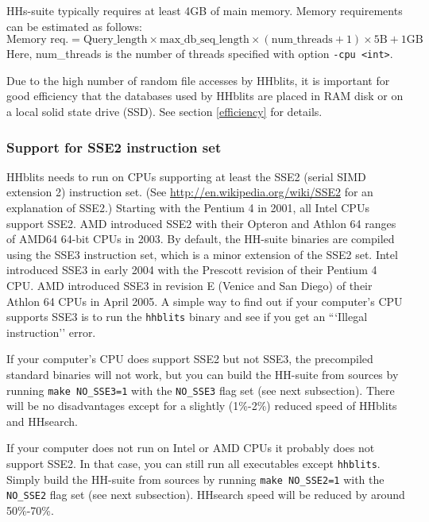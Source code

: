 \documentclass[11pt,a4paper]{article}
\begin{document}
HHs-suite typically requires at least 4GB of main memory. Memory requirements can be estimated as follows:
\begin{equation}
\textrm{Memory req.} = \textrm{Query\_length} \times \textrm{max\_db\_seq\_length} \times (\textrm{num\_threads}+1) \times 5 \textrm{B} + 1 \textrm{GB} 
\end{equation}
Here, num\_threads is the number of threads specified with option \verb`-cpu <int>`.

Due to the high number of random file accesses by HHblits, it is important for good efficiency that the databases used by HHblits are placed in RAM disk or on a local solid state drive (SSD). See section \ref{efficiency} for details.


\subsubsection*{Support for SSE2 instruction set} 

HHblits needs to run on CPUs supporting at least the SSE2 (serial SIMD extension 2) instruction set. (See \url{http://en.wikipedia.org/wiki/SSE2} for an explanation of SSE2.) Starting with the Pentium 4 in 2001, all Intel CPUs support SSE2. AMD introduced SSE2 with their Opteron and Athlon 64 ranges of AMD64 64-bit CPUs in 2003. By default, the HH-suite binaries are compiled using the SSE3 instruction set, which is a minor extension of the SSE2 set. Intel introduced SSE3 in early 2004 with the Prescott revision of their Pentium 4 CPU. AMD introduced SSE3 in revision E (Venice and San Diego) of their Athlon 64 CPUs in April 2005. A simple way to find out if your computer's CPU supports SSE3 is to run the \verb`hhblits` binary and see if you get an ```Illegal instruction'' error.

If your computer's CPU does support SSE2 but not SSE3, the precompiled standard binaries will not work, but you can build the HH-suite from sources by running \verb`make NO_SSE3=1` with the \verb`NO_SSE3` flag set (see next subsection). There will be no disadvantages except for a slightly (1\%-2\%) reduced speed of HHblits and HHsearch.

If your computer does not run on Intel or AMD CPUs it probably does not support SSE2. In that case, you can still run all executables except \verb`hhblits`. Simply build the HH-suite from sources by running \verb`make NO_SSE2=1` with the \verb`NO_SSE2` flag set (see next subsection). HHsearch speed will be reduced by around 50\%-70\%.
\end{document}
